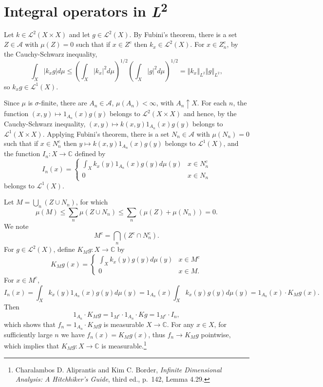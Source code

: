 \documentclass{article}
\newcommand{\norm}[1]{\left\Vert #1 \right\Vert}
\theoremstyle{definition}
\begin{document}
\section{Integral operators in {\em L}\textsuperscript{2}}
Let $k \in \mathscr{L}^2(X \times X)$ and let $g \in \mathscr{L}^2(X)$. 
By Fubini's theorem, there is a set $Z \in \mathscr{A}$ with $\mu(Z)=0$ such that
if $x \in Z^c$ then $k_x \in \mathscr{L}^2(X)$. For $x \in Z_n^c$, by the Cauchy-Schwarz inequality,
\[
\int_X |k_x g| d\mu \leq \left( \int_X |k_x|^2 d\mu\right)^{1/2} \left( \int_X |g|^2 d\mu \right)^{1/2} = \norm{k_x}_{L^2} 
\norm{g}_{L^2},
\]
so $k_x g \in \mathscr{L}^1(X)$. 



Since $\mu$ is $\sigma$-finite, there are 
$A_n \in \mathscr{A}$, $\mu(A_n)<\infty$, with
$A_n \uparrow X$. 
For each $n$, the function $(x,y) \mapsto 1_{A_n}(x)  g(y)$ belongs to $\mathscr{L}^2(X \times X)$ and 
hence, by the Cauchy-Schwarz inequality,
$(x,y) \mapsto k(x,y) 1_{A_n}(x) g(y)$
belongs to $\mathscr{L}^1(X \times X)$. 
Applying Fubini's theorem, there is a set $N_n \in \mathscr{A}$ with $\mu(N_n)=0$ such that
if $x \in N_n^c$ then
$y \mapsto k(x,y) 1_{A_n}(x) g(y)$ belongs to 
$\mathscr{L}^1(X)$, 
and the function $I_n:X \to \mathbb{C}$ defined by
\[
I_n(x)=\begin{cases}
\int_X k_x(y) 1_{A_n}(x) g(y) d\mu(y)&x \in N_n^c\\
0&x \in N_n
\end{cases}
\]
belongs to $\mathscr{L}^1(X)$.

Let $M = \bigcup_n (Z \cup N_n)$, for which
\[
\mu(M) \leq \sum_n \mu(Z \cup N_n) \leq \sum_n (\mu(Z)+\mu(N_n)) = 0. 
\]
We note
\[
M^c = \bigcap_n (Z^c \cap N_n^c).
\]
For $g \in \mathscr{L}^2(X)$, define
$K_M g:X \to \mathbb{C}$ by
\begin{equation}
K_M g(x) =\begin{cases}
\int_X k_x(y) g(y) d\mu(y)&x \in M^c\\
0&x \in M.
\end{cases}
\label{KM}
\end{equation}
For $x \in M^c$,
\[
I_n(x) = \int_X k_x(y) 1_{A_n}(x) g(y) d\mu(y) =1_{A_n}(x) \int_X k_x(y) g(y) d\mu(y)
=1_{A_n}(x) \cdot K_M g(x).
\]
Then
\[
1_{A_n} \cdot K_M g = 1_{M^c} \cdot 1_{A_n} \cdot Kg = 1_{M^c} \cdot I_n,
\]
which shows that $f_n=1_{A_n} \cdot K_M g$ is measurable $X \to \mathbb{C}$. 
For any $x \in X$,
for sufficiently large $n$ we have
$f_n(x)=K_M g(x)$, thus
$f_n \to K_M g$ pointwise, which implies
that $K_M g:X \to \mathbb{C}$ is measurable.\footnote{Charalambos D. Aliprantis and Kim C. Border,
{\em Infinite Dimensional Analysis: A Hitchhiker's Guide}, third ed., p.~142, Lemma 4.29.}
\end{document}
